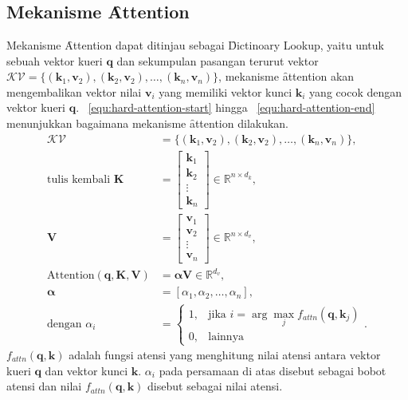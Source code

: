 \chapter{\babTiga}
\label{bab:3}


\section{Mekanisme \f{Attention}}
Mekanisme \f{Attention} dapat ditinjau sebagai \f{Dictinoary Lookup}, yaitu untuk sebuah vektor kueri $\mathbf{q}$ dan sekumpulan pasangan terurut vektor $\mathcal{KV} = \{(\mathbf{k}_1, \mathbf{v}_2), (\mathbf{k}_2, \mathbf{v}_2), \dots, (\mathbf{k}_n, \mathbf{v}_n)\}$, mekanisme \f{attention} akan mengembalikan vektor nilai $\mathbf{v}_i$ yang memiliki vektor kunci $\mathbf{k}_i$ yang cocok dengan vektor kueri $\mathbf{q}$. \equ~\ref{equ:hard-attention-start} hingga \equ~\ref{equ:hard-attention-end} menunjukkan bagaimana mekanisme \f{attention} dilakukan.
\begin{align}
	\label{equ:hard-attention-start}
	\mathcal{KV} &= \{(\mathbf{k}_1, \mathbf{v}_2), (\mathbf{k}_2, \mathbf{v}_2), \dots, (\mathbf{k}_n, \mathbf{v}_n)\}, \\
	\text{tulis kembali }\mathbf{K}&= \begin{bmatrix}
		\mathbf{k}_1 \\
		\mathbf{k}_2 \\
		\vdots \\
		\mathbf{k}_n
	\end{bmatrix} \in \mathbb{R}^{n \times d_k}, \\
	\mathbf{V} &= \begin{bmatrix}
		\mathbf{v}_1 \\
		\mathbf{v}_2 \\
		\vdots \\
		\mathbf{v}_n
	\end{bmatrix} \in \mathbb{R}^{n \times d_v}, \\
	\text{Attention}(\mathbf{q}, \mathbf{K}, \mathbf{V}) &= \bm{\alpha}\mathbf{V} \in \mathbb{R}^{d_v},\\
	\bm{\alpha} &= [\alpha_{1}, \alpha_{2}, \dots, \alpha_{n}], \\
	\label{equ:hard-attention-end}
	\text{dengan } \alpha_i &= 
	\begin{cases}
		1, & \text{jika } i = \arg\max_{j} f_{attn}(\mathbf{q}, \mathbf{k}_j) \\
	0, & \text{lainnya}
	\end{cases}.
	\end{align}
	$f_{attn}(\mathbf{q}, \mathbf{k})$ adalah fungsi atensi yang menghitung nilai atensi antara vektor kueri $\mathbf{q}$ dan vektor kunci $\mathbf{k}$. $\alpha_i$ pada persamaan di atas disebut sebagai bobot atensi dan nilai $f_{attn}(\mathbf{q}, \mathbf{k})$ disebut sebagai nilai atensi.
	
